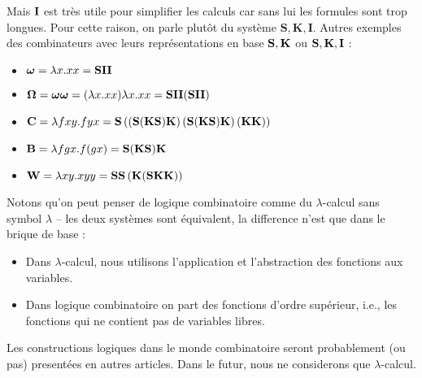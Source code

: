 Mais $\mathbf{I}$ est très utile pour simplifier les calculs car sans lui les formules sont trop longues. Pour cette raison, on parle plutôt du système $\mathbf{S, K, I}$.
Autres exemples des combinateurs avec leurs représentations en base $\mathbf{S}, \mathbf{K}$ ou $\mathbf{S}, \mathbf{K}, \mathbf{I}$ :
\begin{itemize}
	\item $\bm{\omega} = \lambda x. xx = \mathbf{S} \mathbf{I} \mathbf{I}$
	\item $\mathbf{\Omega} = \bm{\omega} \bm{\omega} = (\lambda x. xx) \lambda x. xx = \mathbf{S} \mathbf{I} \mathbf{I} (\mathbf{S} \mathbf{I} \mathbf{I})$
	\item $\mathbf{C}
		= \lambda fxy. fyx
		= \mathbf{S}
			\left(
				\left(\mathbf{S}(\mathbf{K}\mathbf{S})\mathbf{K}\right)
				\left(\mathbf{S}(\mathbf{K}\mathbf{S})\mathbf{K}\right)
				(\mathbf{K}\mathbf{K})
			\right)$
	\item $\mathbf{B} = \lambda fgx. f(gx) = \mathbf{S}(\mathbf{K}\mathbf{S})\mathbf{K}$
	\item $\mathbf{W} = \lambda xy. xyy = \mathbf{S} \mathbf{S} \left(\mathbf{K} (\mathbf{S} \mathbf{K} \mathbf{K})\right)$
\end{itemize}


Notons qu'on peut penser de logique combinatoire comme du $\lambda$-calcul sans symbol $\lambda$ -- les deux systèmes sont équivalent, la difference n'est que dans le brique de base :
\begin{itemize}
	\item Dans $\lambda$-calcul, nous utilisons l'application et l'abstraction des fonctions aux variables.
	\item Dans logique combinatoire on part des fonctions d'ordre supérieur, i.e., les fonctions qui ne contient pas de variables libres.
\end{itemize}
Les constructions logiques dans le monde combinatoire seront probablement (ou pas) presentées en autres articles.
Dans le futur, nous ne considerons que $\lambda$-calcul.

